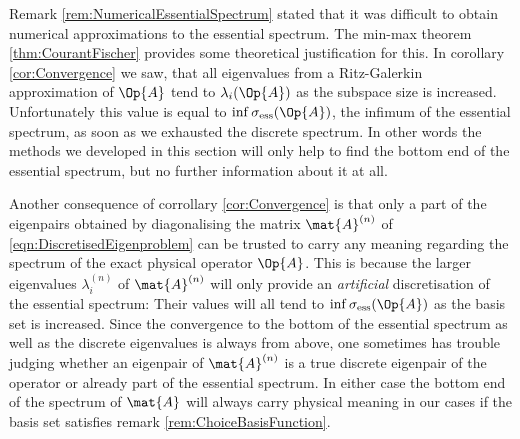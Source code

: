 \begin{rem}
Remark \vref{rem:NumericalEssentialSpectrum}
stated that it was difficult
to obtain numerical approximations to the essential spectrum.
The min-max theorem \vref{thm:CourantFischer}
provides some theoretical justification for this.
In corollary \vref{cor:Convergence} we saw,
that all eigenvalues from a Ritz-Galerkin approximation
of $\Op{A}$ tend to $\lambda_i(\Op{A})$
as the subspace size is increased.
Unfortunately this value is equal to $\inf \sigma_\text{ess}(\Op{A})$,
the infimum of the essential spectrum,
as soon as we exhausted the discrete spectrum.
In other words the methods we developed in this section
will only help to find the bottom end of the essential spectrum,
but no further information about it at all.

Another consequence of corrollary \ref{cor:Convergence} is
that only a part of the eigenpairs obtained by
diagonalising the matrix $\mat{A}^{(n)}$ of \vref{eqn:DiscretisedEigenproblem}
can be trusted to carry any meaning regarding
the spectrum of the exact physical operator $\Op{A}$.
This is because the larger eigenvalues $\lambda_i^{(n)}$
of $\mat{A}^{(n)}$ will only provide an \emph{artificial}
discretisation of the essential spectrum:
Their values will all tend to $\inf \sigma_\text{ess}(\Op{A})$
as the basis set is increased.
Since the convergence to the bottom of the essential spectrum
as well as the discrete eigenvalues is always from above,
one sometimes has trouble judging whether
an eigenpair of $\mat{A}^{(n)}$
is a true discrete eigenpair of the operator or already
part of the essential spectrum.
In either case the bottom end of the spectrum of $\mat{A}$
will always carry physical meaning in our cases if the basis
set satisfies remark \vref{rem:ChoiceBasisFunction}.
\end{rem}


